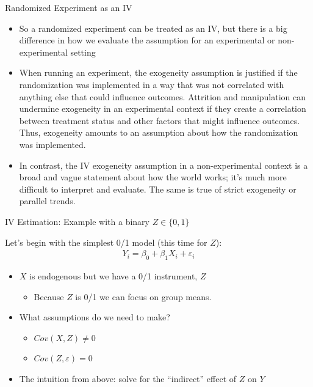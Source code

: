 \documentclass[aspectratio=169,11pt]{beamer}
\begin{document}
\begin{frame}{ Randomized Experiment as an IV}
\begin{itemize}
\item So a randomized experiment can be treated as an IV, but there is a big difference in
	how we evaluate the assumption for an experimental or non-experimental setting
\medskip
\item When running an experiment, the exogeneity assumption is justified if the
	randomization was implemented in a way that was not correlated with anything else that could
	influence outcomes. Attrition and manipulation can undermine exogeneity in an experimental context
	if they create a correlation between treatment status and other factors that might influence outcomes.
	 Thus, exogeneity amounts to an assumption about how the randomization was implemented.
	\medskip
	\item In contrast, the IV exogeneity assumption in a non-experimental context is a broad and vague statement
	about how the world works; it's much more difficult to interpret and evaluate. The same is
	true of strict exogeneity or parallel trends.
\end{itemize}
\end{frame}


\begin{frame}{IV Estimation: Example with a binary $Z \in\{0,1\}$}

Let's begin with the simplest 0/1 model (this time for $Z$):
\begin{align*}
	Y_i = \beta_0 + \beta_1 X_i + \varepsilon_i
\end{align*}

\begin{itemize}
	\item  $X$ is endogenous but we have a 0/1 instrument, $Z$
	\begin{itemize}
		\item Because $Z$ is 0/1 we can focus on group means.
	\end{itemize}

	\item What assumptions do we need to make?
		\begin{itemize}
			\item $Cov(X,Z)\ne 0$
			\item $Cov(Z,\varepsilon) = 0$
		\end{itemize}
	\item The intuition from above: solve for the ``indirect'' effect of $Z$ on $Y$
\end{itemize}

\end{frame}
\end{document}
